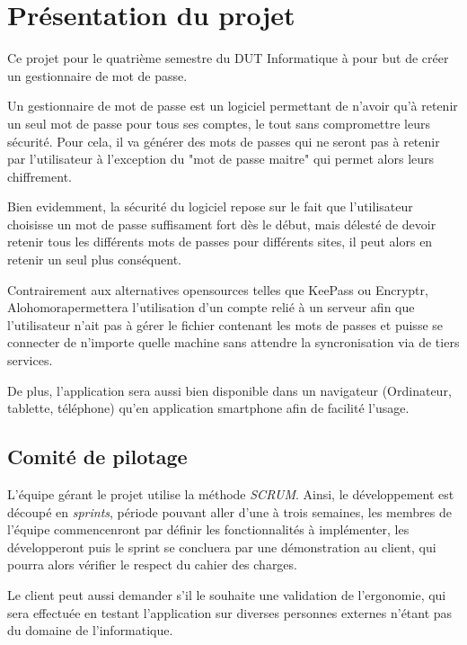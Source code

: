 \documentclass[oneside]{report}
\newcommand\softname{Alohomora}
\begin{document}
	\chapter{Présentation du projet}
	\vspace{2cm}
	\par Ce projet pour le quatrième semestre du DUT Informatique à pour but de créer un gestionnaire de mot de passe.
	\vspace{.5cm}
	\par Un gestionnaire de mot de passe est un logiciel permettant de n'avoir qu'à retenir un seul mot de passe pour tous ses comptes, le tout sans compromettre leurs sécurité. Pour cela, il va générer des mots de passes qui ne seront pas à retenir par l'utilisateur à l'exception du "mot de passe maitre" qui permet alors leurs chiffrement.
	\vspace{.5cm}
	\par Bien evidemment, la sécurité du logiciel repose sur le fait que l'utilisateur choisisse un mot de passe suffisament fort dès le début, mais délesté de devoir retenir tous les différents mots de passes pour différents sites, il peut alors en retenir un seul plus conséquent.
	\vspace{.5cm}
	\par Contrairement aux alternatives opensources telles que KeePass ou Encryptr, \softname permettera l'utilisation d'un compte relié à un serveur afin que l'utilisateur n'ait pas à gérer le fichier contenant les mots de passes et puisse se connecter de n'importe quelle machine sans attendre la syncronisation via de tiers services.

	\vspace{.5cm}
	\par De plus, l'application sera aussi bien disponible dans un navigateur (Ordinateur, tablette, téléphone) qu'en application smartphone afin de facilité l'usage.

	\newpage

	\section{Comité de pilotage}
	{
		\par L'équipe gérant le projet utilise la méthode \textit{SCRUM}. Ainsi, le développement est découpé en \textit{sprints}, période pouvant aller d'une à trois semaines, les membres de l'équipe commencenront par définir les fonctionnalités à implémenter, les développeront puis le sprint se concluera par une démonstration au client, qui pourra alors vérifier le respect du cahier des charges.
		\vspace{.5cm}
		\par Le client peut aussi demander s'il le souhaite une validation de l'ergonomie, qui sera effectuée en testant l'application sur diverses personnes externes n'étant pas du domaine de l'informatique.
	}
\end{document}
